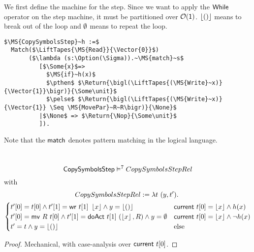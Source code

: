 We first define the machine for the step.  Since we want to apply the $\mathsf{While}$ operator on the step machine, it must be partitioned over
$\mathcal{O}(\mathsf{1})$.  $\left\lfloor {\ensuremath{\mathsf{()}}} \right\rfloor$ means to break out of the loop and $\emptyset$ means to repeat the loop.
\begin{definition}
  \label{CopySymbols_Step}
\begin{lstlisting}[style=semicoqstyle]
$\MS{CopySymbolsStep}~h :=$
  Match($\LiftTapes{\MS{Read}}{\Vector{0}}$)
       ($\lambda (s:\Option(\Sigma)).~\MS{match}~s$
          [$\Some{x}$=>
            $\MS{if}~h(x)$
            $\pthen$ $\Return{\bigl(\LiftTapes{(\MS{Write}~x)}{\Vector{1}}\bigr)}{\Some\unit}$ 
            $\pelse$ $\Return{\bigl(\LiftTapes{(\MS{Write}~x)}{\Vector{1}} \Seq \MS{MovePar}~R~R\bigr)}{\None}$ 
          |$\None$ => $\Return{\Nop}{\Some\unit}$ 
          ]).
\end{lstlisting}
\end{definition}

Note that the $\mathsf{match}$ denotes pattern matching in the logical language.

\begin{lemma}
  \label{lem:CopySymbols_Step_Sem}
  ~
  \[
    \mathsf{CopySymbolsStep} \mathrel{\vDash^{7}} CopySymbolsStepRel
  \]
  with
  \small
  \begin{multline*}
    CopySymbolsStepRel := \lambda t~(y, t').~\\
    \begin{cases}
      t'[0] = t[0]           \land t'[1]=\mathsf{wr}~t[1]~\left\lfloor {x} \right\rfloor         \land y=\left\lfloor {\ensuremath{\mathsf{()}}} \right\rfloor & \mathsf{current}~t[0]=\left\lfloor {x} \right\rfloor \land       h(x) \\
      t'[0] = \mathsf{mv}~R~t[0] \land t'[1]=\mathsf{doAct}~t[1]~(\left\lfloor {x} \right\rfloor, R) \land y=\emptyset      & \mathsf{current}~t[0]=\left\lfloor {x} \right\rfloor \land \lnot h(x) \\
      t' = t \land y=\left\lfloor {\ensuremath{\mathsf{()}}} \right\rfloor                                                           & \text{else}
    \end{cases}
  \end{multline*}
\end{lemma}
\begin{proof}
  Mechanical, with case-analysis over $\mathsf{current}~t[0]$.
\end{proof}

